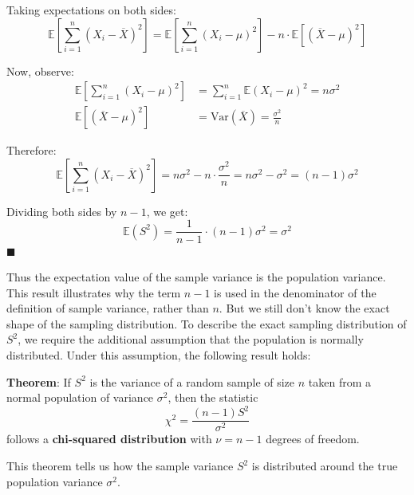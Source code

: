 \documentclass[twoside]{book}
\begin{document}
Taking expectations on both sides:
\[
\mathbb{E}\left[\sum_{i=1}^{n} (X_i - \overline{X})^2 \right] = \mathbb{E}\left[ \sum_{i=1}^{n} (X_i - \mu)^2 \right] - n \cdot \mathbb{E}\left[(\overline{X} - \mu)^2 \right]
\]

Now, observe:
\begin{align*}
\mathbb{E}\left[\sum_{i=1}^{n} (X_i - \mu)^2 \right] &= \sum_{i=1}^{n} \mathbb{E}(X_i - \mu)^2 = n\sigma^2 \\
\mathbb{E}\left[(\overline{X} - \mu)^2 \right] &= \text{Var}(\overline{X}) = \frac{\sigma^2}{n}
\end{align*}

Therefore:
\[
\mathbb{E}\left[\sum_{i=1}^{n} (X_i - \overline{X})^2 \right] = n\sigma^2 - n \cdot \frac{\sigma^2}{n} = n\sigma^2 - \sigma^2 = (n - 1)\sigma^2
\]

Dividing both sides by \( n - 1 \), we get:
\[
\mathbb{E}(S^2) = \frac{1}{n - 1} \cdot (n - 1)\sigma^2 = \sigma^2
\]
\hfill $\blacksquare$

Thus the expectation value of the sample variance is the population variance. This result illustrates why the term \( n - 1 \) is used in the denominator of the definition of sample variance, rather than \( n \).
But we still don't know the exact shape of the sampling distribution. To describe the exact sampling distribution of \( S^2 \), we require the additional assumption that the population is normally distributed. Under this assumption, the following result holds:


\begin{textbox}
\textbf{Theorem}: If $S^2$ is the variance of a random sample of size $n$ taken from a normal population of variance $\sigma^2$, then the statistic
\[
\chi^2 = \frac{(n - 1)S^2}{\sigma^2}
\]
follows a \textbf{chi-squared distribution} with \( \nu = n - 1 \) degrees of freedom.
\end{textbox}

This theorem tells us how the sample variance \( S^2 \) is distributed around the true population variance \( \sigma^2 \).
\end{document}
